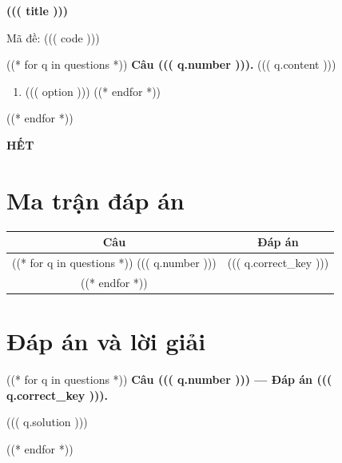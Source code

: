 \documentclass[12pt,a4paper]{article}
\begin{document}
\begin{center}
{\Large\bfseries ((( title )))}\par
Mã đề: ((( code )))
\end{center}
((* for q in questions *))
\noindent\textbf{Câu ((( q.number ))).} ((( q.content )))
\begin{enumerate}[label=\Alph*.,leftmargin=2em]
((* for option in q.options *))
\item ((( option )))
((* endfor *))
\end{enumerate}
((* endfor *))
\begin{center}\textbf{HẾT}\end{center}
\clearpage
\section*{Ma trận đáp án}
\begin{center}
\begin{tabular}{|c|c|}
\hline
Câu & Đáp án \\
\hline
((* for q in questions *))
((( q.number ))) & ((( q.correct_key ))) \\
\hline
((* endfor *))
\end{tabular}
\end{center}
\section*{Đáp án và lời giải}
((* for q in questions *))
\noindent\textbf{Câu ((( q.number ))) — Đáp án ((( q.correct_key ))).}

((( q.solution )))

\medskip
((* endfor *))
\end{document}

